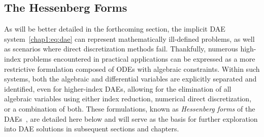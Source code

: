 \subsection{The Hessenberg Forms}

As will be better detailed in the forthcoming section, the implicit \ac{DAE} system~\eqref{chap1:eq:dae} can represent mathematically ill-defined problems, as well as scenarios where direct discretization methods fail. Thankfully, numerous high-index problems encountered in practical applications can be expressed as a more restrictive formulation composed of \acp{ODE} with algebraic constraints. Within such systems, both the algebraic and differential variables are explicitly separated and identified, even for higher-index \acp{DAE}, allowing for the elimination of all algebraic variables using either index reduction, numerical direct discretization, or a combination of both. These formulations, known as \emph{Hessenberg forms} of the \acp{DAE}~\cite{brenan1995numerical}, are detailed here below and will serve as the basis for further exploration into \ac{DAE} solutions in subsequent sections and chapters.
%
